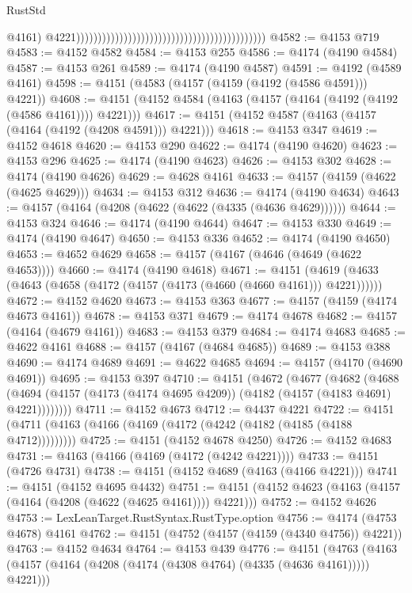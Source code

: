 \begin{lexlean}{RustStd}
\begin{coremodule}
                                                                                              @4161)
                                                                                            @4221))))))))))))))))))))))))))))))))))))))))))))
@4582 := @4153 @719
@4583 := @4152 @4582
@4584 := @4153 @255
@4586 := @4174 (@4190 @4584)
@4587 := @4153 @261
@4589 := @4174 (@4190 @4587)
@4591 := @4192 (@4589 @4161)
@4598 := @4151 (@4583 (@4157 (@4159 (@4192 (@4586 @4591))) @4221))
@4608 := @4151 (@4152 @4584 (@4163 (@4157 (@4164 (@4192 (@4192 (@4586 @4161)))) @4221)))
@4617 := @4151 (@4152 @4587 (@4163 (@4157 (@4164 (@4192 (@4208 @4591))) @4221)))
@4618 := @4153 @347
@4619 := @4152 @4618
@4620 := @4153 @290
@4622 := @4174 (@4190 @4620)
@4623 := @4153 @296
@4625 := @4174 (@4190 @4623)
@4626 := @4153 @302
@4628 := @4174 (@4190 @4626)
@4629 := @4628 @4161
@4633 := @4157 (@4159 (@4622 (@4625 @4629)))
@4634 := @4153 @312
@4636 := @4174 (@4190 @4634)
@4643 := @4157 (@4164 (@4208 (@4622 (@4622 (@4335 (@4636 @4629))))))
@4644 := @4153 @324
@4646 := @4174 (@4190 @4644)
@4647 := @4153 @330
@4649 := @4174 (@4190 @4647)
@4650 := @4153 @336
@4652 := @4174 (@4190 @4650)
@4653 := @4652 @4629
@4658 := @4157 (@4167 (@4646 (@4649 (@4622 @4653))))
@4660 := @4174 (@4190 @4618)
@4671 := @4151 (@4619 (@4633 (@4643 (@4658 (@4172 (@4157 (@4173 (@4660 (@4660 @4161))) @4221))))))
@4672 := @4152 @4620
@4673 := @4153 @363
@4677 := @4157 (@4159 (@4174 @4673 @4161))
@4678 := @4153 @371
@4679 := @4174 @4678
@4682 := @4157 (@4164 (@4679 @4161))
@4683 := @4153 @379
@4684 := @4174 @4683
@4685 := @4622 @4161
@4688 := @4157 (@4167 (@4684 @4685))
@4689 := @4153 @388
@4690 := @4174 @4689
@4691 := @4622 @4685
@4694 := @4157 (@4170 (@4690 @4691))
@4695 := @4153 @397
@4710 := @4151
    (@4672
      (@4677
        (@4682
          (@4688 (@4694 (@4157 (@4173 (@4174 @4695 @4209)) (@4182 (@4157 (@4183 @4691) @4221))))))))
@4711 := @4152 @4673
@4712 := @4437 @4221
@4722 := @4151 (@4711 (@4163 (@4166 (@4169 (@4172 (@4242 (@4182 (@4185 (@4188 @4712)))))))))
@4725 := @4151 (@4152 @4678 @4250)
@4726 := @4152 @4683
@4731 := @4163 (@4166 (@4169 (@4172 (@4242 @4221))))
@4733 := @4151 (@4726 @4731)
@4738 := @4151 (@4152 @4689 (@4163 (@4166 @4221)))
@4741 := @4151 (@4152 @4695 @4432)
@4751 := @4151 (@4152 @4623 (@4163 (@4157 (@4164 (@4208 (@4622 (@4625 @4161)))) @4221)))
@4752 := @4152 @4626
@4753 := LexLeanTarget.RustSyntax.RustType.option
@4756 := @4174 (@4753 @4678) @4161
@4762 := @4151 (@4752 (@4157 (@4159 (@4340 @4756)) @4221))
@4763 := @4152 @4634
@4764 := @4153 @439
@4776 := @4151
    (@4763 (@4163 (@4157 (@4164 (@4208 (@4174 (@4308 @4764) (@4335 (@4636 @4161))))) @4221)))

\end{coremodule}
\end{lexlean}
